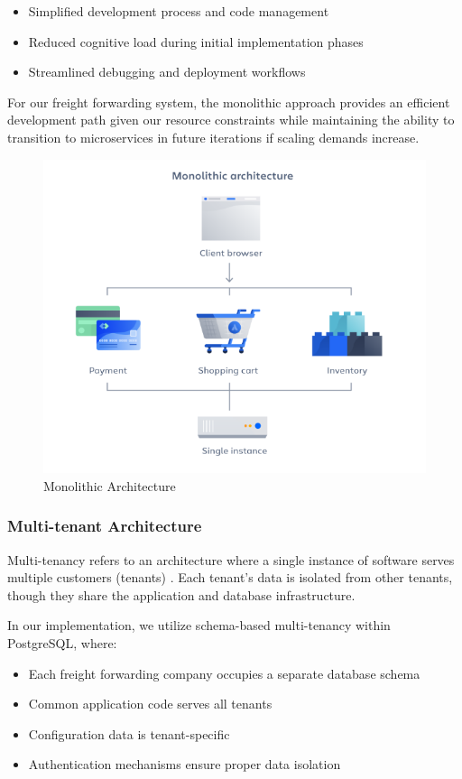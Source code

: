 \begin{itemize}
    \item Simplified development process and code management
    \item Reduced cognitive load during initial implementation phases
    \item Streamlined debugging and deployment workflows
\end{itemize}

For our freight forwarding system, the monolithic approach provides an efficient development path given our resource constraints while maintaining the ability to transition to microservices in future iterations if scaling demands increase.

\begin{figure}[H]
    \centering
    \includegraphics[width=15cm]{graphics/background-knowledge/monolithic-architecture.png}
    \caption{Monolithic Architecture}
    \label{fig:Monolithic Architecture}
\end{figure}

\subsubsection{Multi-tenant Architecture}
Multi-tenancy refers to an architecture where a single instance of software serves multiple customers (tenants) \cite{bezemer2010multitenant}. Each tenant's data is isolated from other tenants, though they share the application and database infrastructure.

In our implementation, we utilize schema-based multi-tenancy within PostgreSQL, where:
\begin{itemize}
    \item Each freight forwarding company occupies a separate database schema
    \item Common application code serves all tenants
    \item Configuration data is tenant-specific
    \item Authentication mechanisms ensure proper data isolation
\end{itemize}

